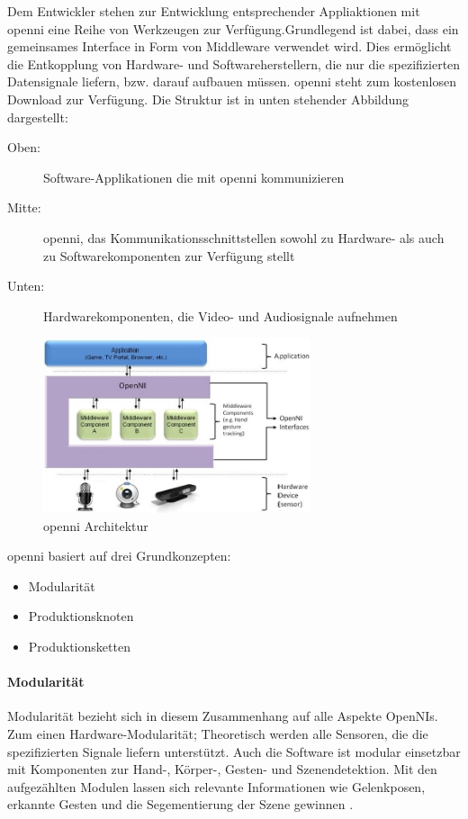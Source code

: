Dem Entwickler stehen zur Entwicklung entsprechender Appliaktionen mit \gls{openni} eine Reihe von Werkzeugen zur Verfügung.Grundlegend ist dabei, dass ein gemeinsames Interface in Form von Middleware verwendet wird.
Dies ermöglicht die Entkopplung von Hardware- und Softwareherstellern, die nur die spezifizierten Datensignale liefern, bzw. darauf aufbauen müssen.
\gls{openni} steht zum kostenlosen Download zur Verfügung.
Die Struktur ist in unten stehender Abbildung dargestellt: 

\begin{description}
 \item[Oben:] Software-Applikationen die mit \gls{openni} kommunizieren
 \item[Mitte:] \gls{openni}, das Kommunikationsschnittstellen sowohl zu Hardware- als auch zu Softwarekomponenten zur Verfügung stellt
 \item[Unten:] Hardwarekomponenten, die Video- und Audiosignale aufnehmen
\end{description}

\begin{figure}[h]
	\center
	\includegraphics[width=0.7\textwidth]{graphics/openNI.jpg}
	\caption{\label{fig:openNI} \gls{openni} Architektur \cite{kinect_6}}
\end{figure}

\gls{openni} basiert auf drei Grundkonzepten:
\begin{itemize}
  \item Modularität
  \item Produktionsknoten
  \item Produktionsketten
\end{itemize}


\paragraph{Modularität}
Modularität bezieht sich in diesem Zusammenhang auf alle Aspekte OpenNIs.
Zum einen Hardware-Modularität;
Theoretisch werden alle Sensoren, die die spezifizierten Signale liefern unterstützt.
Auch die Software ist modular einsetzbar mit Komponenten zur Hand-, Körper-, Gesten- und Szenendetektion.
Mit den aufgezählten Modulen lassen sich relevante Informationen wie Gelenkposen, erkannte Gesten und die Segementierung der Szene gewinnen \cite{kinect_6}.

